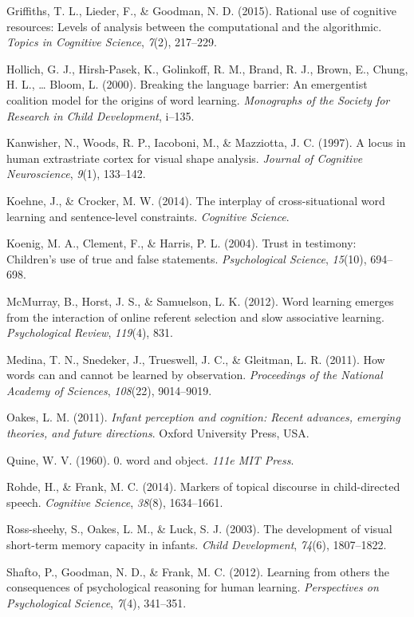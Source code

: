 \documentclass[a4paper,man,natbib]{apa6}
\begin{document}
Griffiths, T. L., Lieder, F., \& Goodman, N. D. (2015). Rational use of
cognitive resources: Levels of analysis between the computational and
the algorithmic. \emph{Topics in Cognitive Science}, \emph{7}(2),
217--229.

Hollich, G. J., Hirsh-Pasek, K., Golinkoff, R. M., Brand, R. J., Brown,
E., Chung, H. L., \ldots{} Bloom, L. (2000). Breaking the language
barrier: An emergentist coalition model for the origins of word
learning. \emph{Monographs of the Society for Research in Child
Development}, i--135.

Kanwisher, N., Woods, R. P., Iacoboni, M., \& Mazziotta, J. C. (1997). A
locus in human extrastriate cortex for visual shape analysis.
\emph{Journal of Cognitive Neuroscience}, \emph{9}(1), 133--142.

Koehne, J., \& Crocker, M. W. (2014). The interplay of cross-situational
word learning and sentence-level constraints. \emph{Cognitive Science}.

Koenig, M. A., Clement, F., \& Harris, P. L. (2004). Trust in testimony:
Children's use of true and false statements. \emph{Psychological
Science}, \emph{15}(10), 694--698.

McMurray, B., Horst, J. S., \& Samuelson, L. K. (2012). Word learning
emerges from the interaction of online referent selection and slow
associative learning. \emph{Psychological Review}, \emph{119}(4), 831.

Medina, T. N., Snedeker, J., Trueswell, J. C., \& Gleitman, L. R.
(2011). How words can and cannot be learned by observation.
\emph{Proceedings of the National Academy of Sciences}, \emph{108}(22),
9014--9019.

Oakes, L. M. (2011). \emph{Infant perception and cognition: Recent
advances, emerging theories, and future directions}. Oxford University
Press, USA.

Quine, W. V. (1960). 0. word and object. \emph{111e MIT Press}.

Rohde, H., \& Frank, M. C. (2014). Markers of topical discourse in
child-directed speech. \emph{Cognitive Science}, \emph{38}(8),
1634--1661.

Ross-sheehy, S., Oakes, L. M., \& Luck, S. J. (2003). The development of
visual short-term memory capacity in infants. \emph{Child Development},
\emph{74}(6), 1807--1822.

Shafto, P., Goodman, N. D., \& Frank, M. C. (2012). Learning from others
the consequences of psychological reasoning for human learning.
\emph{Perspectives on Psychological Science}, \emph{7}(4), 341--351.
\end{document}
